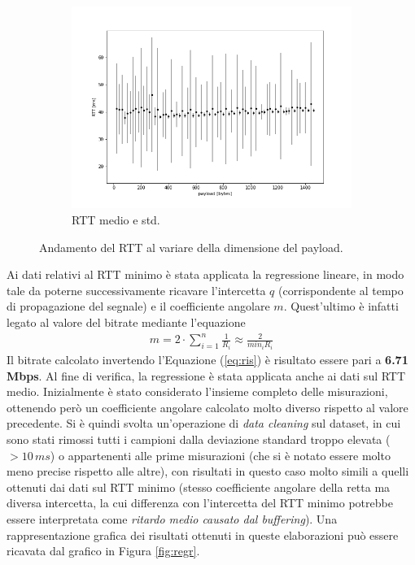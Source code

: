 \documentclass[a4paper,10pt]{article}
\begin{document}
\begin{figure}[h!]
\begin{subfigure}[b]{0.325\textwidth}
         \includegraphics[width=\textwidth]{img/avg.png}
         \caption{RTT medio e std.}
         \label{fig:rttavg}
     \end{subfigure}
        \caption{Andamento del RTT al variare della dimensione del payload.}
        \label{fig:rttfig}
\end{figure}
\noindent
Ai dati relativi al RTT minimo è stata applicata la regressione lineare, in modo tale da poterne successivamente ricavare l'intercetta $q$ (corrispondente al tempo di propagazione del segnale) e il coefficiente angolare $m$. Quest'ultimo è infatti legato al valore del bitrate mediante l'equazione 
\vspace{-0.3cm}
\begin{align}
m = 2 \cdot \sum_{i=1}^{n}  \frac{1}{R_i} \approx \frac{2}{min_i R_i}
\label{eq:ris}
\end{align}
Il bitrate calcolato invertendo l'Equazione (\ref{eq:ris}) è risultato essere pari a \textbf{6.71 Mbps}. Al fine di verifica, la regressione è stata applicata anche ai dati sul RTT medio. Inizialmente è stato considerato l'insieme completo delle misurazioni, ottenendo però un coefficiente angolare calcolato molto diverso rispetto al valore precedente. Si è quindi svolta un'operazione di \textit{data cleaning} sul dataset, in cui sono stati rimossi tutti i campioni dalla deviazione standard troppo elevata ($>10\,ms$) o appartenenti alle prime misurazioni (che si è notato essere molto meno precise rispetto alle altre), con risultati in questo caso molto simili a quelli ottenuti dai dati sul RTT minimo (stesso coefficiente angolare della retta ma diversa intercetta, la cui differenza con l'intercetta del RTT minimo potrebbe essere interpretata come \textit{ritardo medio causato dal buffering}). Una rappresentazione grafica dei risultati ottenuti in queste elaborazioni può essere ricavata dal grafico in Figura \ref{fig:regr}. 
\end{document}
